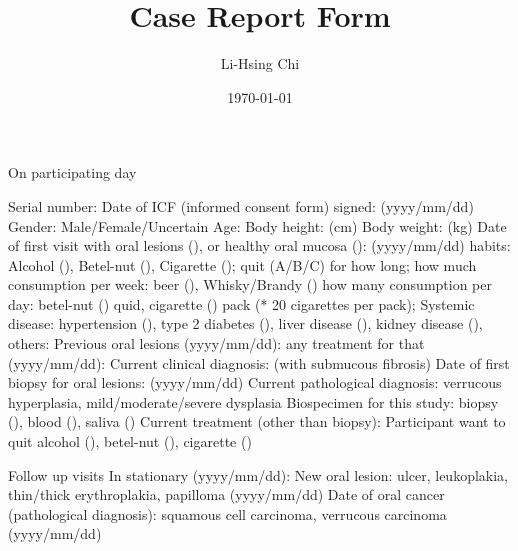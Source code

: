 \documentclass{article}
\title{Case Report Form}
\author{Li-Hsing Chi}
\date{\today}
\begin{document}
                          

\maketitle


\begin{outline}

\0 On participating day

\1 Serial number:
\1 Date of ICF (informed consent form) signed: (yyyy/mm/dd)
\1 Gender: Male/Female/Uncertain
\1 Age:
\1 Body height: (cm)
\1 Body weight: (kg)
\1 Date of first visit with oral lesions (), or healthy oral mucosa (): (yyyy/mm/dd)
    \2 habits: Alcohol (), Betel-nut (), Cigarette ();
        \3 quit (A/B/C) for how long;
        \3 how much consumption per week: beer (), Whisky/Brandy ()
        \3 how many consumption per day: betel-nut () quid, cigarette () pack {\footnotesize (* 20 cigarettes per pack)};
\1 Systemic disease: hypertension (), type 2 diabetes (), liver disease (), kidney disease (), others:
\1 Previous oral lesions (yyyy/mm/dd):
    \2 any treatment for that (yyyy/mm/dd):
\1 Current clinical diagnosis: (with submucous fibrosis)
\1 Date of first biopsy for oral lesions: (yyyy/mm/dd)
\1 Current pathological diagnosis: verrucous hyperplasia, mild/moderate/severe dysplasia
    \1 Biospecimen for this study: biopsy (), blood (), saliva ()
\1 Current treatment (other than biopsy):
\1 Participant want to quit alcohol (), betel-nut (), cigarette ()

\0 Follow up visits
\1 In stationary (yyyy/mm/dd):
    \2 New oral lesion: ulcer, leukoplakia, thin/thick erythroplakia, papilloma (yyyy/mm/dd)
    \2 Date of oral cancer (pathological diagnosis): squamous cell carcinoma, verrucous carcinoma (yyyy/mm/dd)
\end{outline}

                        
\end{document}
